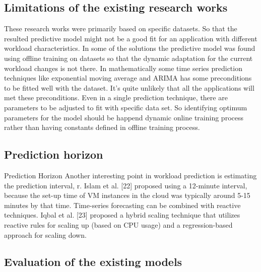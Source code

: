 \subsection{Limitations of the existing research works}

 These research works were primarily based on specific datasets. So that the resulted predictive model might not be a good fit for an application with different workload characteristics. In some of the solutions the predictive model was found using offline training on datasets so that the dynamic adaptation for the current workload changes is not there. 
In mathematically some time series prediction techniques like exponential moving average and ARIMA has some preconditions to be fitted well with the dataset. It’s quite unlikely that all the applications will met these preconditions. Even in a single prediction technique, there are parameters to be adjusted to fit with specific data set. So identifying optimum parameters for the model should be happend dynamic online training process rather than having constants defined in offline training process.


\subsection{Prediction horizon}

Prediction Horizon
Another interesting point in workload prediction is estimating the prediction interval, r. Islam et al. [22] proposed using a 12-minute interval, because the set-up time of VM instances in the cloud was typically around 5-15 minutes by that time. Time-series forecasting can be combined with reactive techniques. Iqbal et al. [23] proposed a hybrid scaling technique that utilizes reactive rules for scaling up (based on CPU usage) and a regression-based approach for scaling down.

\subsection{Evaluation of the existing models}

